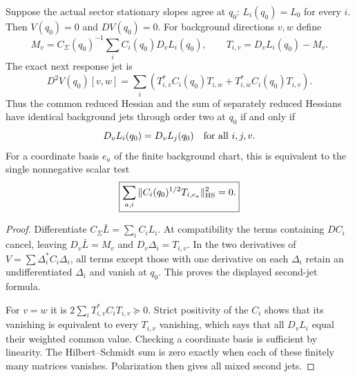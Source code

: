 \documentclass[12pt,a4paper]{article}
\begin{document}
\begin{theorem}
\label{p3a:v251:thm:shared-second-jet}
Suppose the actual sector stationary slopes agree at $q_0$:
$L_i(q_0)=L_0$ for every $i$.  Then $V(q_0)=0$ and $DV(q_0)=0$.
For background directions $v,w$ define
\[
 M_v=C_\Sigma(q_0)^{-1}\sum_i C_i(q_0)D_vL_i(q_0),
 \qquad T_{i,v}=D_vL_i(q_0)-M_v.
\]
The exact next response jet is
\begin{equation}
\label{p3a:v251:eq:shared-second-jet}
 \boxed{D^2V(q_0)[v,w]
 =\sum_i\left(T_{i,v}^*C_i(q_0)T_{i,w}
                  +T_{i,w}^*C_i(q_0)T_{i,v}\right).}
\end{equation}
Thus the common reduced Hessian and the sum of separately reduced
Hessians have identical background jets through order two at $q_0$
if and only if
\[
 D_vL_i(q_0)=D_vL_j(q_0)
 \quad\hbox{for all }i,j,v.
\]
For a coordinate basis $e_a$ of the finite background chart, this is
equivalent to the single nonnegative scalar test
\begin{equation}
\label{p3a:v251:eq:finite-variance-certificate}
 \boxed{\sum_{a,i}\|C_i(q_0)^{1/2}T_{i,e_a}\|_{\rm HS}^2=0.}
\end{equation}
\end{theorem}
\begin{proof}
Differentiate $C_\Sigma\bar L=\sum_iC_iL_i$.  At compatibility the
terms containing $DC_i$ cancel, leaving
$D_v\bar L=M_v$ and $D_v\Delta_i=T_{i,v}$.  In the two derivatives
of $V=\sum\Delta_i^*C_i\Delta_i$, all terms except those with one
derivative on each $\Delta_i$ retain an undifferentiated $\Delta_i$
and vanish at $q_0$.  This proves the displayed second-jet formula.

For $v=w$ it is $2\sum_iT_{i,v}^*C_iT_{i,v}\succeq0$.
Strict positivity of the $C_i$ shows that its vanishing is equivalent
to every $T_{i,v}$ vanishing, which says that all $D_vL_i$ equal
their weighted common value.  Checking a coordinate basis is sufficient
by linearity.  The Hilbert--Schmidt sum is zero exactly when each of
these finitely many matrices vanishes.  Polarization then gives all
mixed second jets.
\end{proof}
\end{document}

